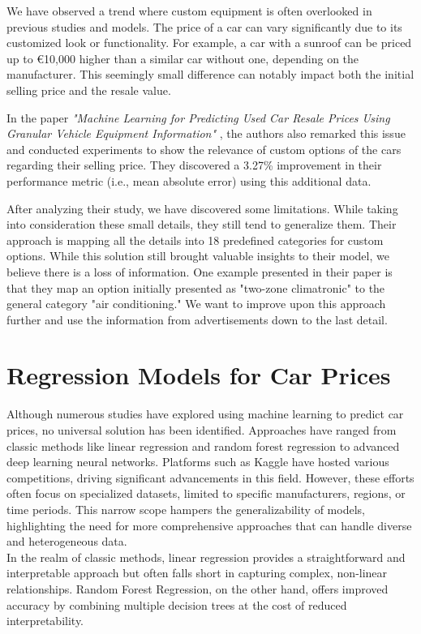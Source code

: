 We have observed a trend where custom equipment is often overlooked in previous studies and models. The price of a car can vary significantly due to its customized look or functionality. For example, a car with a sunroof can be priced up to €10,000 higher than a similar car without one, depending on the manufacturer. This seemingly small difference can notably impact both the initial selling price and the resale value.

In the paper \textit{"Machine Learning for Predicting Used
Car Resale Prices Using Granular Vehicle Equipment Information"} \cite{granular}, the authors also remarked this issue and conducted experiments to show the relevance of custom options of the cars regarding their selling price. They discovered a 3.27\% improvement in their performance metric (i.e., mean absolute error) using this additional data.

After analyzing their study, we have discovered some limitations. While taking into consideration these small details, they still tend to generalize them. Their approach is mapping all the details into 18 predefined categories for custom options. While this solution still brought valuable insights to their model, we believe there is a loss of information. One example presented in their paper is that they map an option initially presented as "two-zone climatronic" to the general category "air conditioning." We want to improve upon this approach further and use the information from advertisements down to the last detail.

\section{Regression Models for Car Prices}
Although numerous studies have explored using machine learning to predict car prices, no universal solution has been identified. Approaches have ranged from classic methods like linear regression and random forest regression to advanced deep learning neural networks. Platforms such as Kaggle \cite{kaggle} have hosted various competitions, driving significant advancements in this field. However, these efforts often focus on specialized datasets, limited to specific manufacturers, regions, or time periods. This narrow scope hampers the generalizability of models, highlighting the need for more comprehensive approaches that can handle diverse and heterogeneous data.
\\

In the realm of classic methods, linear regression provides a straightforward and interpretable approach but often falls short in capturing complex, non-linear relationships. Random Forest Regression, on the other hand, offers improved accuracy by combining multiple decision trees at the cost of reduced interpretability.
\\

